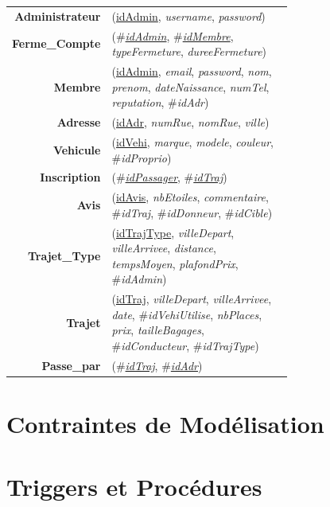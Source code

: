 \documentclass[a4paper,12pt]{article}
\newenvironment{mld}
  {\par\begin{minipage}{\linewidth}\begin{tabular}{rp{0.7\linewidth}}}
  {\end{tabular}\end{minipage}\par}
\newcommand{\attr}[1]{\emph{#1}}
\newcommand{\prim}[1]{\uline{#1}}
\newcommand{\foreign}[1]{\#\textsl{#1}}
\theoremstyle{remark}
\begin{document}
\begin{mld}
  \textbf{Administrateur} & (\prim{idAdmin}, \attr{username}, \attr{password})\\
  \textbf{Ferme\_Compte} & (\foreign{\prim{idAdmin}}, \foreign{\prim{idMembre}}, \attr{typeFermeture}, \attr{dureeFermeture})\\
  \textbf{Membre} & (\prim{idAdmin}, \attr{email}, \attr{password}, \attr{nom}, \attr{prenom}, \attr{dateNaissance}, \attr{numTel}, \attr{reputation}, \foreign{idAdr})\\
  \textbf{Adresse} & (\prim{idAdr}, \attr{numRue}, \attr{nomRue}, \attr{ville})\\
  \textbf{Vehicule} & (\prim{idVehi}, \attr{marque}, \attr{modele}, \attr{couleur}, \foreign{idProprio})\\
  \textbf{Inscription} & (\foreign{\prim{idPassager}}, \foreign{\prim{idTraj}})\\
  \textbf{Avis} & (\prim{idAvis}, \attr{nbEtoiles}, \attr{commentaire}, \foreign{idTraj}, \foreign{idDonneur}, \foreign{idCible})\\
  \textbf{Trajet\_Type} & (\prim{idTrajType}, \attr{villeDepart}, \attr{villeArrivee}, \attr{distance}, \attr{tempsMoyen}, \attr{plafondPrix}, \foreign{idAdmin})\\
  \textbf{Trajet} & (\prim{idTraj}, \attr{villeDepart}, \attr{villeArrivee}, \attr{date}, \foreign{idVehiUtilise}, \attr{nbPlaces}, \attr{prix}, \attr{tailleBagages}, \foreign{idConducteur}, \foreign{idTrajType})\\
  \textbf{Passe\_par} & (\foreign{\prim{idTraj}}, \foreign{\prim{idAdr}})\\
\end{mld}

\section*{Contraintes de Modélisation}
\label{sec:contraintes}

\section*{Triggers et Procédures}
\label{sec:triggers}
\end{document}
